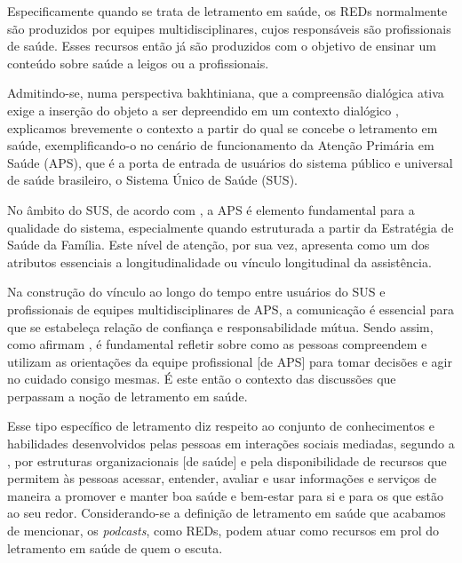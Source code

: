 Especificamente quando se trata de letramento em saúde, os REDs normalmente são produzidos por equipes multidisciplinares, cujos responsáveis são profissionais de saúde. Esses recursos então já são produzidos com o objetivo de ensinar um conteúdo sobre saúde a leigos ou a profissionais.

Admitindo-se, numa perspectiva bakhtiniana, que a compreensão dialógica ativa exige a inserção do objeto a ser depreendido em um contexto dialógico \cite{bakhtin2017}, explicamos brevemente o contexto a partir do qual se concebe o letramento em saúde, exemplificando-o no cenário de funcionamento da Atenção Primária em Saúde (APS), que é a porta de entrada de usuários do sistema público e universal de saúde brasileiro, o Sistema Único de Saúde (SUS).

No âmbito do SUS, de acordo com {\textcite{marques2022}}, a APS é elemento fundamental para a qualidade do sistema, especialmente quando estruturada a partir da Estratégia de Saúde da Família. Este nível de atenção, por sua vez, apresenta como um dos atributos essenciais a longitudinalidade ou vínculo longitudinal da assistência.

 Na construção do vínculo ao longo do tempo entre usuários do SUS e profissionais de equipes multidisciplinares de APS, a comunicação é essencial para que se estabeleça relação de confiança e responsabilidade mútua. Sendo assim, como afirmam \textcite{sampaio2015}, é fundamental refletir sobre como as pessoas compreendem e utilizam as orientações da equipe profissional [de APS] para tomar decisões e agir no cuidado consigo mesmas. É este então o contexto das discussões que perpassam a noção de letramento em saúde.

Esse tipo específico de letramento diz respeito ao conjunto de conhecimentos e habilidades desenvolvidos pelas pessoas em interações sociais mediadas, segundo a \textcite{who2021}, por estruturas organizacionais [de saúde] e pela disponibilidade de recursos que permitem às pessoas acessar, entender, avaliar e usar informações e serviços de maneira a promover e manter boa saúde e bem-estar para si e para os que estão ao seu redor. Considerando-se a definição de letramento em saúde que acabamos de mencionar, os \textit{podcasts}, como REDs, podem atuar como recursos em prol do letramento em saúde de quem o escuta.

